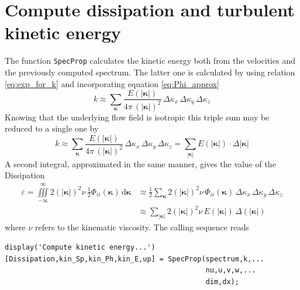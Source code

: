 \documentclass[preprint,12pt,ntfdMod]{elsarticle}
\begin{document}
\section{Compute dissipation and turbulent kinetic energy}

\begin{par}

  The function \lstinline!SpecProp! calculates the kinetic energy both
  from the velocities and the previously computed spectrum. The latter
  one is calculated by using relation \eqref{eq:exp_for_k} and
  incorporating equation \eqref{eq:Phi_approx}
  \begin{equation}
      k\approx\sum\limits_{\boldsymbol\kappa}\frac{E(|\boldsymbol\kappa|)}{4\pi\,
      (|\boldsymbol\kappa|)^2}\,\Delta\kappa_x\,\Delta\kappa_y\,
      \Delta\kappa_z
  \end{equation}
Knowing that the underlying flow field is isotropic this triple sum may be
reduced to a single one by
  \begin{equation}
      k\approx\sum\limits_{\boldsymbol\kappa}\frac{E(|\boldsymbol\kappa|)}{4\pi\,
      (|\boldsymbol\kappa|)^2}\,\Delta\kappa_x\,\Delta\kappa_y\,
      \Delta\kappa_z=
      \sum\limits_{|\boldsymbol\kappa|}E(|\boldsymbol\kappa|)\cdot\Delta|\boldsymbol\kappa|
  \end{equation}
  A second integral, approximated in the same manner, gives the value
  of the Dissipation
  \begin{align}
      \label{eq:Phi_approx}
      \varepsilon=\iiint\limits_{-\infty}^{\infty}2(|\boldsymbol\kappa|)^2\nu\,\frac{1}{2}\Phi_{ii}(\boldsymbol\kappa)\,\mathrm{d}\boldsymbol\kappa
      &\displaystyle\approx\frac{1}{2}\sum\limits_{\boldsymbol\kappa}2(|\boldsymbol\kappa|)^2\nu\,\Phi_{ii}(\boldsymbol\kappa)
      \,\Delta\kappa_x\,\Delta\kappa_y\,\Delta\kappa_z\\
      &\displaystyle\approx\sum\limits_{|\boldsymbol\kappa|}2(|\boldsymbol\kappa|)^2
      \nu\,E(|\boldsymbol\kappa|)\,\Delta(|\boldsymbol\kappa|)
  \end{align}
  where $\nu$ refers to the kinematic viscosity.
  The calling sequence reads

\end{par} \vspace{1em}
\begin{verbatim}
display('Compute kinetic energy...')
[Dissipation,kin_Sp,kin_Ph,kin_E,up] = SpecProp(spectrum,k,...
                                                nu,u,v,w,...
                                                dim,dx);
\end{verbatim}
\begin{par}



\end{par} \vspace{1em}
\end{document}
